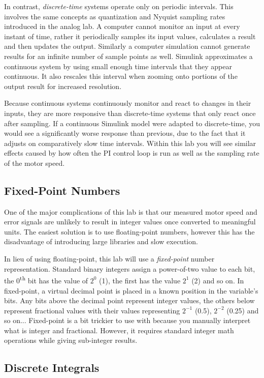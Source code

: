 \documentclass[11pt,fleqn]{book} %
\begin{document}
In contrast, \textit{discrete-time} systems operate only on periodic intervals. This involves the same concepts as quantization and Nyquist sampling rates introduced in the analog lab. A computer cannot monitor an input at every instant of time, rather it periodically samples its input values, calculates a result and then updates the output. Similarly a computer simulation cannot generate results for an infinite number of sample points as well. Simulink approximates a continuous system by using small enough time intervals that they appear continuous. It also rescales this interval when zooming onto portions of the output result for increased resolution. 

Because continuous systems continuously monitor and react to changes in their inputs, they are more responsive than discrete-time systems that only react once after sampling. If a continuous Simulink model were adapted to discrete-time, you would see a significantly worse response than previous, due to the fact that it adjusts on comparatively slow time intervals. Within this lab you will see similar effects caused by how often the PI control loop is run as well as the sampling rate of the motor speed.  

\subsection{Fixed-Point Numbers}
One of the major complications of this lab is that our measured motor speed and error signals are unlikely to result in integer values once converted to meaningful units. The easiest solution is to use floating-point numbers, however this has the disadvantage of introducing large libraries and slow execution. 

In lieu of using floating-point, this lab will use a \textit{fixed-point} number representation. Standard binary integers assign a power-of-two value to each bit, the 0\textsuperscript{th} bit has the value of $2^{0}$ (1), the first has the value $2^{1}$ (2) and so on. In fixed-point, a virtual decimal point is placed in a known position in the variable's bits. Any bits above the decimal point represent integer values, the others below represent fractional values with their values representing $2^{-1}$ (0.5), $2^{-2}$ (0.25) and so on...
Fixed-point is a bit trickier to use with because you manually interpret what is integer and fractional. However, it requires standard integer math operations while giving sub-integer results. 


\subsection{Discrete Integrals}
\end{document}
